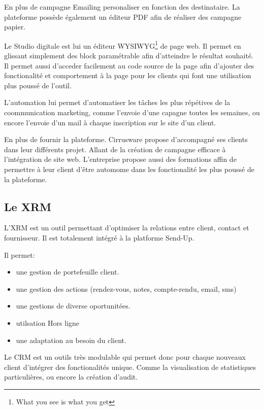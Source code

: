 En plus de campagne Emailing personaliser en fonction des destinataire. La plateforme possède également un éditeur PDF afin de réaliser des campagne papier. 

Le Studio digitale est lui un éditeur WYSIWYG\footnote{What you see is what you get} de page web. Il permet en glissant simplement des block paramétrable afin d'atteindre le résultat souhaité. Il permet aussi d'acceder facilement au code source de la page afin d'ajouter des fonctionalité et comportement à la page pour les clients qui font une utilisation plus poussé de l'outil.

L'automation lui permet d'automatiser les tâches les plus répétives de la coommunication marketing, comme l'envoie d'une capagne toutes les semaines, ou encore l'envoie d'un mail à chaque inscription sur le site d'un client. 

En plus de fournir la plateforme. Cirrusware propose d'accompagné ses clients dans leur différents projet. Allant de la création de campagne efficace à l'intégration de site web. L'entreprise propose aussi des formations affin de permettre à leur client d'être automome dans les fonctionalité les plus poussé de la plateforme.

\subsection{Le XRM}
L'XRM est un outil permettant d'optimiser la relations entre client, contact et fournisseur. Il est totalement intégré à la platforme Send-Up.

Il permet: 
\begin{itemize}
    \item une gestion de portefeuille client. 
    \item une gestion des actions (rendez-vous, notes, compte-rendu, email, sms)
    \item une gestions de diverse oportunitées. 
    \item utilsation Hors ligne
    \item une adaptation au besoin du client. 
\end{itemize}

Le CRM est un outils très modulable qui permet donc pour chaque nouveaux client d'intégrer des fonctionalités unique. Comme la visualisation de statistiques particulières, ou encore la création d'audit.  

